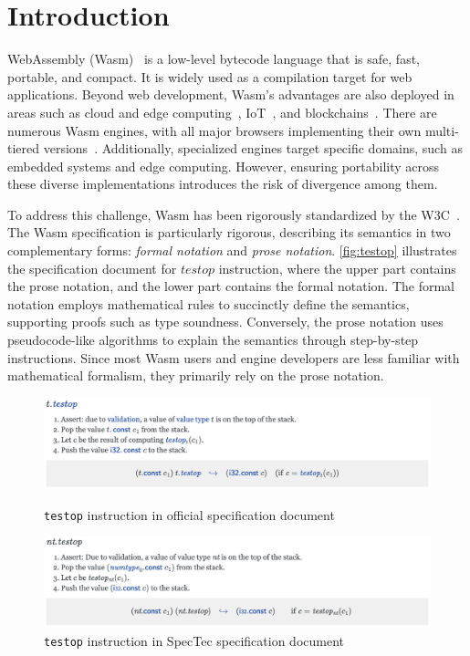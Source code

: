 
\chapter{Introduction}
\label{ch:intro}
\noindent

WebAssembly (Wasm)~\cite{wasm} is a low-level bytecode language that is safe,
fast, portable, and compact.
It is widely used as a compilation target for web applications.
Beyond web development, Wasm's advantages are also deployed in areas such as
cloud and edge computing~\cite{lucet, cloudflare}, IoT~\cite{wasm-iot}, and
blockchains~\cite{wasm-blockchain}.
There are numerous Wasm engines, with all major browsers implementing their own
multi-tiered versions~\cite{v8, spidermonkey, webkit}.
Additionally, specialized engines target specific domains, such as embedded
systems and edge computing.
However, ensuring portability across these diverse implementations introduces
the risk of divergence among them.


To address this challenge, Wasm has been rigorously standardized by the
W3C~\cite{wasm-w3c}.
The Wasm specification is particularly rigorous, describing its semantics in
two complementary forms: \textit{formal notation} and \textit{prose notation}.
\cref{fig:testop} illustrates the specification document for $testop$
instruction, where the upper part contains the prose notation, and the lower
part contains the formal notation.
The formal notation employs mathematical rules to succinctly define the
semantics, supporting proofs such as type soundness.
Conversely, the prose notation uses pseudocode-like algorithms to explain the
semantics through step-by-step instructions.
Since most Wasm users and engine developers are less familiar with mathematical
formalism, they primarily rely on the prose notation.

\begin{figure}[t]
    \centerline{\includegraphics[width=15cm]{fig/testop}}
    \caption[\texttt{testop} instruction in official specification document]
      {\texttt{testop} instruction in official specification document}
      \label{fig:testop}
    \centerline{\includegraphics[width=15cm]{fig/spectec-testop}}
    \caption[\texttt{testop} instruction in SpecTec specification document]
      {\texttt{testop} instruction in SpecTec specification document}
      \label{fig:spectec-testop}
\end{figure}


